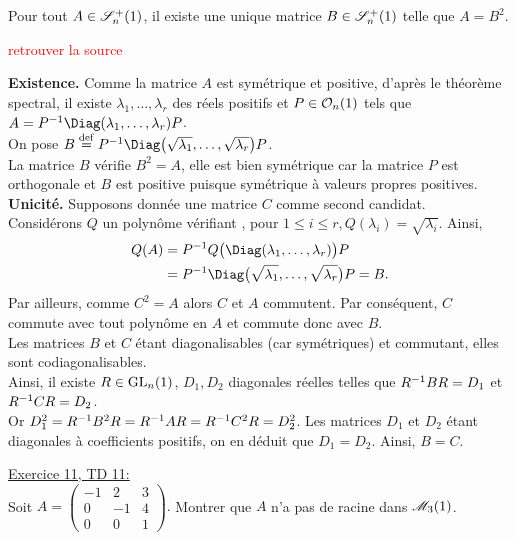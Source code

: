 \begin{prop}
    Pour tout $A \in \mathscr{S}_n^+(1)$, il existe une unique matrice $B \in \mathscr{S}_n^+(1)$ telle que $A = B^2$. 
\end{prop}
\textcolor{red}{retrouver la source}
\begin{demo}
    \textbf{Existence.} Comme la matrice $A$ est symétrique et positive, d'après le théorème spectral, il existe $\lambda_1, \dots, \lambda_r$ des réels positifs et $P \in \mathcal{O}_n(1)$ tels que $A = \Inv{P} \Diag(\lambda_1, \dots, \lambda_r) P$. \\
    On pose $B \defeq \Inv{P} \Diag \big(\sqrt{\lambda_1}, \dots, \sqrt{\lambda_r} \big) P$. \\
    La matrice $B$ vérifie $B^2 = A$, elle est bien symétrique car la matrice $P$ est orthogonale et $B$ est positive puisque symétrique à valeurs propres positives. \\
    \textbf{Unicité.} Supposons donnée une matrice $C$ comme second candidat. \\
    Considérons $Q$ un polynôme vérifiant   , pour $1 \leqslant i \leqslant r, Q(\lambda_i) = \sqrt{\lambda_i}$. Ainsi, 
    \begin{align*}
        Q(A) &= \Inv{P} Q\big( \Diag(\lambda_1, \dots, \lambda_r) \big) P \\
        &= \Inv{P} \Diag \big(\sqrt{\lambda_1}, \dots, \sqrt{\lambda_r} \big) P = B.
    \end{align*}
    Par ailleurs, comme $C^2 = A$ alors $C$ et $A$ commutent. Par conséquent, $C$ commute avec tout polynôme en $A$ et commute donc avec $B$. \\
    Les matrices $B$ et $C$ étant diagonalisables (car symétriques) et commutant, elles sont codiagonalisables. \\
    Ainsi, il existe $R \in \mathrm{GL}_n(1)$, $D_1, D_2$ diagonales réelles telles que $R^{-1}BR = D_1$ et $R^{-1}CR = D_2$. \\
    Or $D_1^2 = R^{-1} B^2 R = R^{-1} A R = R^{-1} C^2 R = D_2^2$. Les matrices $D_1$ et $D_2$ étant diagonales à coefficients positifs, on en déduit que $D_1 = D_2$. Ainsi, $B = C$.
\end{demo}

\begin{exercice}
    \underline{Exercice 11, TD 11:}\\
    Soit $A = 
    \begin{pmatrix}
        -1 & 2 & 3 \\
        0 & - 1 & 4 \\
        0 & 0 & 1
    \end{pmatrix}. 
    $ Montrer que $A$ n'a pas de racine dans $\mathscr{M}_3(1)$. 
\end{exercice}
